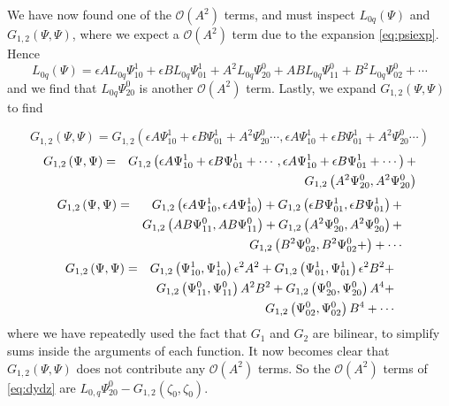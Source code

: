 We have now found one of the $\mathcal{O}(A^2)$ terms, and must inspect $ L_{0q}\left(\Psi\right)$ and $G_{1,2}\left( \Psi, \Psi\right)$,
where we expect a $\mathcal{O}(A^2)$ term due to the expansion \eqref{eq:psiexp}. Hence
\begin{equation}
L_{0q}\left(\Psi\right) = \epsilon A L_{0q} \Psi_{10}^1 + \epsilon B L_{0q} \Psi_{01}^1 + A^2 L_{0q}\Psi_{20}^0 + A B L_{0q} \Psi_{11}^0 + B^2 L_{0q}\Psi_{02}^0 + \cdots 
\end{equation}
and we find that $L_{0q}\Psi_{20}^0$ is another $\mathcal{O}(A^2)$ term. Lastly, we expand $G_{1,2}\left( \Psi, \Psi\right)$ to find

\begin{equation}
G_{1,2}\left(\Psi,\Psi\right) = 
G_{1,2}\left( \epsilon A \Psi_{10}^1 + \epsilon B \Psi_{01}^1 + A^2 \Psi_{20}^0 \cdots, \epsilon A \Psi_{10}^1 + \epsilon B \Psi_{01}^1 + A^2 \Psi_{20}^0 \cdots \right) 
\end{equation}
\begin{align}
G_{1,2}\left(\Psi,\Psi\right) &=& 
G_{1,2}\left( \epsilon A \Psi_{10}^1 + \epsilon B \Psi_{01}^1+\cdots ,\epsilon A \Psi_{10}^1 + \epsilon B \Psi_{01}^1 +\cdots\right) +\\
& &  G_{1,2}\left(A^2 \Psi_{20}^0, A^2 \Psi_{20}^0 \right) \notag
\end{align}
\begin{align}
G_{1,2}\left(\Psi,\Psi\right) &=& G_{1,2}\left(\epsilon A \Psi_{10}^1 ,\epsilon A \Psi_{10}^1\right) + G_{1,2}\left(\epsilon B \Psi_{01}^1, \epsilon B \Psi_{01}^1\right) + \\ 
& &  G_{1,2}\left(A B \Psi_{11}^0 , A B \Psi_{11}^0\right) + G_{1,2}\left(A^2 \Psi_{20}^0, A^2 \Psi_{20}^0 \right) + \notag \\
& &  G_{1,2}\left(B^2 \Psi_{02}^0 ,B^2 \Psi_{02}^0 + \right) + \cdots \notag
\end{align}
\begin{align}
G_{1,2}\left(\Psi,\Psi\right) &=& G_{1,2}\left(\Psi_{10}^1 ,\Psi_{10}^1\right) \epsilon^2 A^2 + 
G_{1,2}\left( \Psi_{01}^1, \Psi_{01}^1\right) \epsilon^2 B^2 + \\ 
& &  G_{1,2}\left(\Psi_{11}^0 , \Psi_{11}^0\right)A^2 B^2 + G_{1,2}\left(\Psi_{20}^0, \Psi_{20}^0 \right)A^4 + \notag \\
& &  G_{1,2}\left(\Psi_{02}^0 , \Psi_{02}^0 \right)B^4 + \cdots \notag
\end{align}
where we have repeatedly used the fact that $G_1$ and $G_2$ are bilinear, to simplify sums inside the arguments of each function. It now becomes clear that $ G_{1,2}\left(\Psi,\Psi\right) $ does not contribute
any $\mathcal{O}(A^2)$ terms.
So the $\mathcal{O}(A^2)$ terms of \eqref{eq:dydz} are  $ L_{0,q} \Psi_{20}^0 - G_{1,2}\left(\zeta_0,\zeta_0\right)$. 


